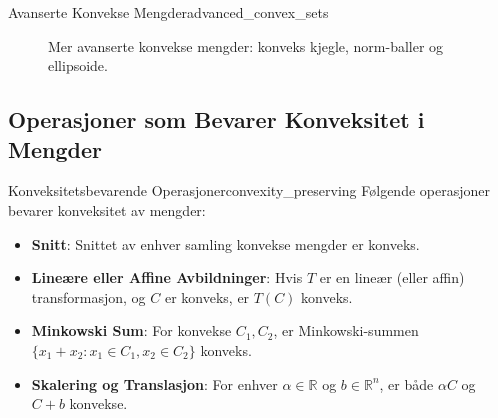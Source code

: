 \begin{example}{Avanserte Konvekse Mengder}{advanced_convex_sets}
\begin{figure}[H]
		\caption{Mer avanserte konvekse mengder: konveks kjegle, norm-baller og ellipsoide.}
		\label{fig:advanced_convex}
	\end{figure}
\end{example}

\subsection{Operasjoner som Bevarer Konveksitet i Mengder}
\begin{theorem}{Konveksitetsbevarende Operasjoner}{convexity_preserving}
	Følgende operasjoner bevarer konveksitet av mengder:
	\begin{itemize}
		\item \textbf{Snitt}: Snittet av enhver samling konvekse mengder er konveks.
		\item \textbf{Lineære eller Affine Avbildninger}: Hvis \( T \) er en lineær (eller affin) transformasjon, og \( C \) er konveks, er \( T(C) \) konveks.
		\item \textbf{Minkowski Sum}: For konvekse \( C_1,C_2 \), er Minkowski-summen \( \{x_1 + x_2 : x_1\in C_1, x_2\in C_2\} \) konveks.
		\item \textbf{Skalering og Translasjon}: For enhver \( \alpha \in \mathbb{R} \) og \( b \in \mathbb{R}^n \), er både \( \alpha C \) og \( C + b \) konvekse.
	\end{itemize}
\end{theorem}

